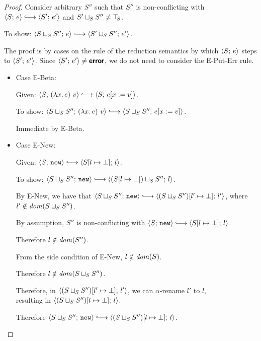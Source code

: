 \begin{proof}
  Consider arbitrary $S''$ such that $S''$ is non-conflicting with
  $\config{S}{e} \parstepsto \config{S'}{e'}$ and $S' \sqcup_{S} S''
  \neq \top\hspace{-0.85mm}_{S}$.

  To show: $\config{\lubstore{S}{S''}}{e} \parstepsto
  \config{\lubstore{S'}{S''}}{e'}$.

  The proof is by cases on the rule of the reduction semantics by
  which $\langle S;\, e \rangle$ steps to $\langle S';\, e' \rangle$.  Since
  $\langle S';\, e' \rangle \neq \textbf{\textsf{error}}$, we do not need to consider the {\sc
    E-Put-Err} rule.
  \begin{itemize}

    \item Case {\sc E-Beta}:

      Given: $\config{S}{\app{(\lam{x}{e})}{v}} \parstepsto
      \config{S}{\subst{e}{x}{v}}$.

      To show: $\config{\lubstore{S}{S''}}{\app{(\lam{x}{e})}{v}}
      \parstepsto \config{\lubstore{S}{S''}}{\subst{e}{x}{v}}$.

      Immediate by {\sc E-Beta}.

    \item Case {\sc E-New}:

      Given: $\config{S}{\NEW} \parstepsto
      \config{\extSRaw{S}{l}{\bot}}{l}$.

      To show: $\config{\lubstore{S}{S''}}{\NEW} \parstepsto
      \config{\lubstore{(\extSRaw{S}{l}{\bot})}{S''}}{l}$.

      By {\sc E-New}, we have that $\config{\lubstore{S}{S''}}{\NEW}
      \parstepsto \config{\extSRaw{(\lubstore{S}{S''})}{l'}{\bot}}{l'}$,
      where $l' \notin \mathit{dom}(S \sqcup_{S} S'')$.

      By assumption, $S''$ is non-conflicting with $\config{S}{\NEW}
      \parstepsto \config{\extSRaw{S}{l}{\bot}}{l}$.
 
      Therefore $l \notin \mathit{dom}(S'')$.

      From the side condition of {\sc E-New}, $l \notin \mathit{dom}(S)$.

      Therefore $l \notin \mathit{dom}(S \sqcup_{S} S'')$.

      Therefore, in
      $\langle (S \sqcup_{S} S'')[l' \mapsto \bot];\, l' \rangle$, we can
      $\alpha$-rename $l'$ to $l$, \\ resulting in
      $\langle (S \sqcup_{S} S'')[l \mapsto \bot];\, l \rangle$.

      Therefore $\config{\lubstore{S}{S''}}{\NEW} \parstepsto
      \config{\extSRaw{(\lubstore{S}{S''})}{l}{\bot}}{l}$.


\end{itemize}
\end{proof}
